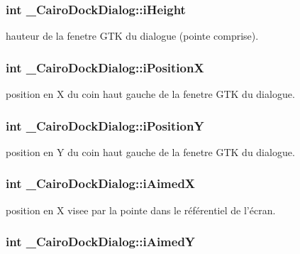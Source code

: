 \subsubsection{\setlength{\rightskip}{0pt plus 5cm}int {\bf \_\-CairoDockDialog::iHeight}}\label{struct__CairoDockDialog_b280ad4a6df4b5e0b2d8e2177fbd4dc5}


hauteur de la fenetre GTK du dialogue (pointe comprise). 

\subsubsection{\setlength{\rightskip}{0pt plus 5cm}int {\bf \_\-CairoDockDialog::iPositionX}}\label{struct__CairoDockDialog_52789327bbacfb15180a878b0a0a0363}


position en X du coin haut gauche de la fenetre GTK du dialogue. 

\subsubsection{\setlength{\rightskip}{0pt plus 5cm}int {\bf \_\-CairoDockDialog::iPositionY}}\label{struct__CairoDockDialog_416a8ef33b989834f7d863b186b50c75}


position en Y du coin haut gauche de la fenetre GTK du dialogue. 

\subsubsection{\setlength{\rightskip}{0pt plus 5cm}int {\bf \_\-CairoDockDialog::iAimedX}}\label{struct__CairoDockDialog_be262824938a38d1ee2a22aa1669f97a}


position en X visee par la pointe dans le référentiel de l'écran. 

\subsubsection{\setlength{\rightskip}{0pt plus 5cm}int {\bf \_\-CairoDockDialog::iAimedY}}\label{struct__CairoDockDialog_2ee4d046788740222018a37db15d9589}


